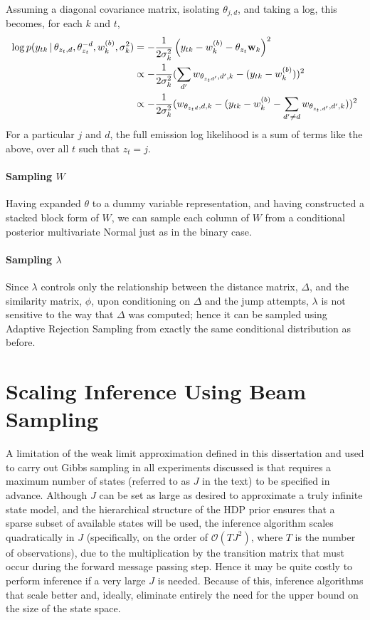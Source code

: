 Assuming a diagonal covariance matrix, isolating $\theta_{j,d}$, and
taking a log, this becomes, for each $k$ and $t$,
\begin{align}
  \log p(y_{tk} \, \vert \, \theta_{z_t,d}, \theta_{z_t}^{-d}, w^{(b)}_k, \sigma^2_k) &=
   -\frac{1}{2\sigma^2_k} \left(y_{tk} -
      w^{(b)}_k-\theta_{z_t}\mathbf{w}_k\right)^2 \\
  &\propto -\frac{1}{2\sigma^2_k} (\sum_{d'} w_{\theta_{z_td'},d',k} -
    (y_{tk} - w^{(b)}_k))^2 \\
  &\propto -\frac{1}{2\sigma^2_k}(w_{\theta_{z_td},d,k} - (y_{tk} -
    w^{(b)}_k - \sum_{d' \neq d} w_{\theta_{z_t,d'},d',k}))^2
\end{align}
For a particular $j$ and $d$, the full emission log likelihood is a sum of
terms like the above, over all $t$ such that $z_t = j$.

\paragraph{Sampling $W$}
Having expanded $\theta$ to a dummy variable representation, and
having constructed a stacked block form of $W$, we can sample each
column of $W$ from a conditional posterior multivariate Normal just
as in the binary case.

\paragraph{Sampling $\lambda$} Since $\lambda$ controls only the relationship between the distance matrix, $\Delta$, and the similarity matrix, $\phi$, upon 
conditioning on $\Delta$ and the jump attempts, $\lambda$ is not sensitive to the way that $\Delta$ was computed; hence it can be sampled using Adaptive Rejection Sampling from exactly the same conditional distribution as before.

\section{Scaling Inference Using Beam Sampling}
\label{sec:scal-infer-using}

A limitation of the weak limit approximation defined in this dissertation and 
used to carry out Gibbs sampling in all experiments discussed is that requires a maximum number of states (referred to as $J$ in the text) to be specified in advance.  
Although $J$ can be set as large as desired to approximate a truly infinite 
state model, and the hierarchical structure of the HDP prior ensures that a 
sparse subset of available states will be used, the inference algorithm scales 
quadratically in $J$ (specifically, on the order of $\mathcal{O}(TJ^2)$, where 
$T$ is the number of observations), due to the multiplication by the transition matrix that must occur during the forward message passing step.  Hence it may be quite costly to 
perform inference if a very large $J$ is needed.  Because of this, inference algorithms that scale better and, ideally, eliminate entirely 
the need for the upper bound on the size of the state space.


